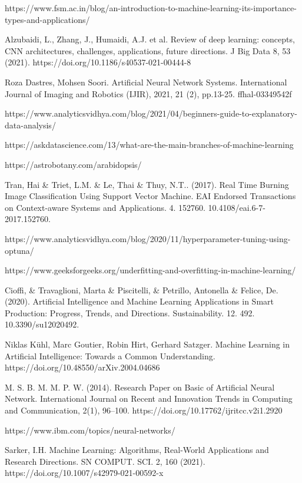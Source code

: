 \documentclass[a4paper,12pt]{report}%
\renewcommand{\\}{\vspace*{0.5\baselineskip} \newline}
\begin{document}
\begin{thebibliography}{1}
https://www.fsm.ac.in/blog/an-introduction-to-machine-learning-its-importance-types-and-applications/

Alzubaidi, L., Zhang, J., Humaidi, A.J. et al. Review of deep learning: concepts, CNN architectures, challenges, applications, future directions. J Big Data 8, 53 (2021). https://doi.org/10.1186/s40537-021-00444-8

Roza Dastres, Mohsen Soori. Artificial Neural Network Systems. International Journal of Imaging
and Robotics (IJIR), 2021, 21 (2), pp.13-25. ffhal-03349542f

https://www.analyticsvidhya.com/blog/2021/04/beginners-guide-to-explanatory-data-analysis/

https://askdatascience.com/13/what-are-the-main-branches-of-machine-learning

https://astrobotany.com/arabidopsis/

Tran, Hai \& Triet, L.M. \& Le, Thai \& Thuy, N.T.. (2017). Real Time Burning Image Classification Using Support Vector Machine. EAI Endorsed Transactions on Context-aware Systems and Applications. 4. 152760. 10.4108/eai.6-7-2017.152760. 

https://www.analyticsvidhya.com/blog/2020/11/hyperparameter-tuning-using-optuna/

https://www.geeksforgeeks.org/underfitting-and-overfitting-in-machine-learning/

Cioffi, \& Travaglioni, Marta \& Piscitelli, \& Petrillo, Antonella \& Felice, De. (2020). Artificial Intelligence and Machine Learning Applications in Smart Production: Progress, Trends, and Directions. Sustainability. 12. 492. 10.3390/su12020492.

Niklas Kühl, Marc Goutier, Robin Hirt, Gerhard Satzger. Machine Learning in Artificial Intelligence: Towards a Common Understanding. 
https://doi.org/10.48550/arXiv.2004.04686

M. S. B. M. M. P. W. (2014). Research Paper on Basic of Artificial Neural Network. International Journal on Recent and Innovation Trends in Computing and Communication, 2(1), 96–100. https://doi.org/10.17762/ijritcc.v2i1.2920

https://www.ibm.com/topics/neural-networks/

Sarker, I.H. Machine Learning: Algorithms, Real-World Applications and Research Directions. SN COMPUT. SCI. 2, 160 (2021). https://doi.org/10.1007/s42979-021-00592-x


\end{thebibliography}
\end{document}
